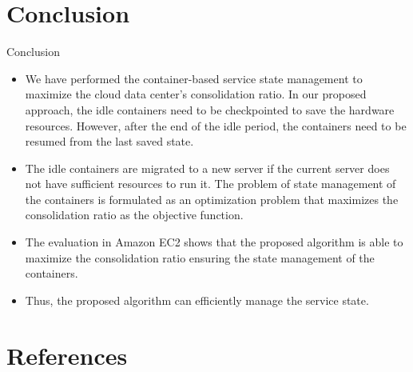 \documentclass[UKenglish]{beamer}
\begin{document}
\section{Conclusion}
\SectionPage

\begin{frame}{Conclusion}
\begin{itemize}
\item We have performed the container-based service state management to maximize the cloud data center’s consolidation ratio. In our proposed approach, the idle containers need to
be checkpointed to save the hardware resources. However,
after the end of the idle period, the containers need to be
resumed from the last saved state. 
\item The idle containers are
migrated to a new server if the current server does not have
sufficient resources to run it. The problem of state management
of the containers is formulated as an optimization problem that
maximizes the consolidation ratio as the objective function. 
\item The evaluation in Amazon EC2
shows that the proposed algorithm is able to maximize the
consolidation ratio ensuring the state management of the containers. 
\item Thus, the proposed algorithm can efficiently manage
the service state.
\end{itemize}
\end{frame}


\section{References}
\SectionPage
\end{document}
